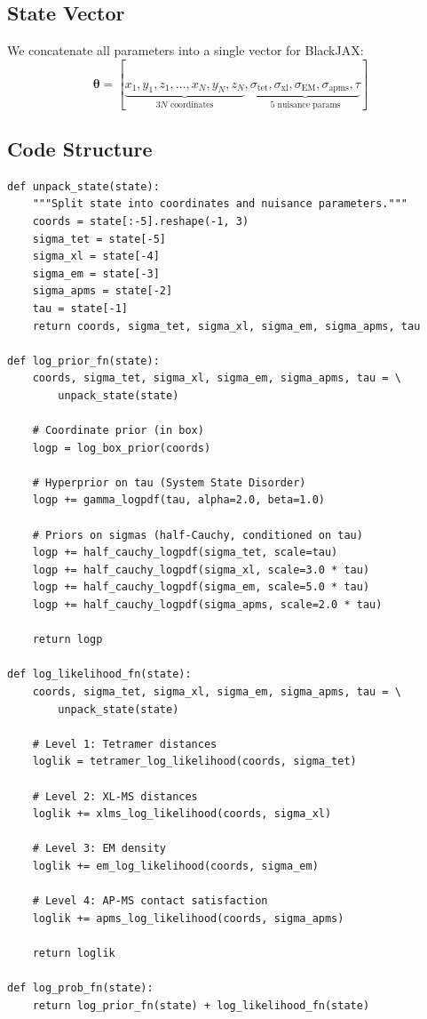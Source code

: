 \documentclass[11pt,a4paper]{article}
\newcommand{\btheta}{\boldsymbol{\theta}}
\theoremstyle{definition}
\begin{document}
\subsection{State Vector}

We concatenate all parameters into a single vector for BlackJAX:
\begin{equation}
    \btheta = [\underbrace{x_1, y_1, z_1, \ldots, x_N, y_N, z_N}_{3N \text{ coordinates}}, 
               \underbrace{\sigma_{\text{tet}}, \sigma_{\text{xl}}, \sigma_{\text{EM}}, \sigma_{\text{apms}}, \tau}_{5 \text{ nuisance params}}]
\end{equation}

\subsection{Code Structure}

\begin{verbatim}
def unpack_state(state):
    """Split state into coordinates and nuisance parameters."""
    coords = state[:-5].reshape(-1, 3)
    sigma_tet = state[-5]
    sigma_xl = state[-4]
    sigma_em = state[-3]
    sigma_apms = state[-2]
    tau = state[-1]
    return coords, sigma_tet, sigma_xl, sigma_em, sigma_apms, tau

def log_prior_fn(state):
    coords, sigma_tet, sigma_xl, sigma_em, sigma_apms, tau = \
        unpack_state(state)
    
    # Coordinate prior (in box)
    logp = log_box_prior(coords)
    
    # Hyperprior on tau (System State Disorder)
    logp += gamma_logpdf(tau, alpha=2.0, beta=1.0)
    
    # Priors on sigmas (half-Cauchy, conditioned on tau)
    logp += half_cauchy_logpdf(sigma_tet, scale=tau)
    logp += half_cauchy_logpdf(sigma_xl, scale=3.0 * tau)
    logp += half_cauchy_logpdf(sigma_em, scale=5.0 * tau)
    logp += half_cauchy_logpdf(sigma_apms, scale=2.0 * tau)
    
    return logp

def log_likelihood_fn(state):
    coords, sigma_tet, sigma_xl, sigma_em, sigma_apms, tau = \
        unpack_state(state)
    
    # Level 1: Tetramer distances
    loglik = tetramer_log_likelihood(coords, sigma_tet)
    
    # Level 2: XL-MS distances
    loglik += xlms_log_likelihood(coords, sigma_xl)
    
    # Level 3: EM density
    loglik += em_log_likelihood(coords, sigma_em)
    
    # Level 4: AP-MS contact satisfaction
    loglik += apms_log_likelihood(coords, sigma_apms)
    
    return loglik

def log_prob_fn(state):
    return log_prior_fn(state) + log_likelihood_fn(state)
\end{verbatim}
\end{document}
